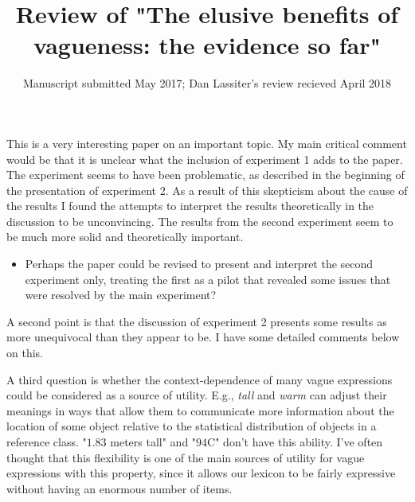 \documentclass{tufte-handout}
\title{Review of "The elusive benefits of vagueness: the evidence so far"}
\date{Manuscript submitted May 2017; Dan Lassiter's review recieved April 2018}
\begin{document}
\maketitle

This is a very interesting paper on an important topic. My main critical comment would be that it is unclear what the inclusion of experiment 1 adds to the paper. The experiment seems to have been problematic, as described in the beginning of the presentation of experiment 2. As a result of this skepticism about the cause of the results I found the attempts to interpret the results theoretically in the discussion to be unconvincing. The results from the second experiment seem to be much more solid and theoretically important. 
\begin{itemize}
\item Perhaps the paper could be revised to present and interpret the second experiment only, treating the first as a pilot that revealed some issues that were resolved by the main experiment?
\end{itemize}

A second point is that the discussion of experiment 2 presents some results as more unequivocal than they appear to be. I have some detailed comments below on this.

A third question is whether the context-dependence of many vague expressions could be considered as a source of utility. E.g., \emph{tall} and \emph{warm} can adjust their meanings in ways that allow them to communicate more information about the location of some object relative to the statistical distribution of objects in a reference class. "$1.83$ meters tall" and "$94$\textdegree C" don't have this ability. I've often thought that this flexibility is one of the main sources of utility for vague expressions with this property, since it allows our lexicon to be fairly expressive without having an enormous number of items.
\end{document}
